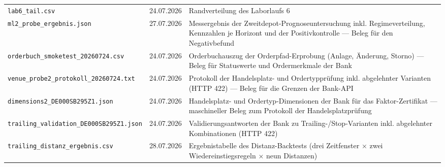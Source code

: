 \begin{longtable}{@{}p{}p{}p{}@{}}
  \texttt{lab6\_\allowbreak tail.csv} & 24.07.2026 & Randverteilung des Laborlaufs 6 \\
  \texttt{ml2\_\allowbreak probe\_\allowbreak ergebnis.json} & 27.07.2026 & Messergebnis der Zweitdepot-Prognoseuntersuchung inkl. Regimeverteilung, Kennzahlen je Horizont und der Positivkontrolle — Beleg für den Negativbefund \\
  \texttt{orderbuch\_\allowbreak smoketest\_\allowbreak 20260724.csv} & 24.07.2026 & Orderbuchauszug der Orderpfad-Erprobung (Anlage, Änderung, Storno) — Beleg für Statuswerte und Ordermerkmale der Bank \\
  \texttt{venue\_\allowbreak probe2\_\allowbreak protokoll\_\allowbreak 20260724.txt} & 24.07.2026 & Protokoll der Handelsplatz- und Ordertypprüfung inkl. abgelehnter Varianten (HTTP 422) — Beleg für die Grenzen der Bank-API \\
  \texttt{dimensions2\_\allowbreak DE000SB295Z1.json} & 24.07.2026 & Handelsplatz- und Ordertyp-Dimensionen der Bank für das Faktor-Zertifikat — maschineller Beleg zum Protokoll der Handelsplatzprüfung \\
  \texttt{trailing\_\allowbreak validation\_\allowbreak DE000SB295Z1.json} & 24.07.2026 & Validierungsantworten der Bank zu Trailing-/Stop-Varianten inkl. abgelehnter Kombinationen (HTTP 422) \\
  \texttt{trailing\_\allowbreak distanz\_\allowbreak ergebnis.csv} & 28.07.2026 & Ergebnistabelle des Distanz-Backtests (drei Zeitfenster × zwei Wiedereinstiegsregeln × neun Distanzen) \\
\end{longtable}
